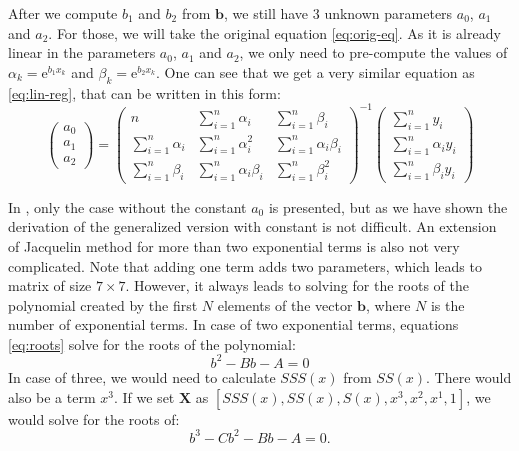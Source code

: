 After we compute $b_1$ and $b_2$ from $\boldsymbol{b}$, we still have 3 unknown parameters $a_0$, $a_1$ and $a_2$. For those, we will take the original equation \ref{eq:orig-eq}. As it is already linear in the parameters $a_0$, $a_1$ and $a_2$, we only need to pre-compute the values of $\alpha_k=\mathrm{e}^{b_1x_k}$ and $\beta_k =\mathrm{e}^{b_2x_k}$.
One can see that we get a very similar equation as \ref{eq:lin-reg}, that can be written in this form:
\begin{equation}
	\begin{pmatrix}
		a_0 \\
		a_1 \\
		a_2
	\end{pmatrix} 
	=
	\begin{pmatrix}
		n & \sum\limits_{i=1}^n\alpha_i & \sum\limits_{i=1}^n\beta_i  \\
		\sum\limits_{i=1}^n\alpha_i & \sum\limits_{i=1}^n\alpha_i^2 & \sum\limits_{i=1}^n\alpha_i\beta_i  \\
		\sum\limits_{i=1}^n\beta_i & \sum\limits_{i=1}^n\alpha_i\beta_i & \sum\limits_{i=1}^n\beta_i^2
	\end{pmatrix}^{-1}
	\begin{pmatrix}
		\sum\limits_{i=1}^ny_i \\
		\sum\limits_{i=1}^n\alpha_iy_i \\
		\sum\limits_{i=1}^n\beta_iy_i
	\end{pmatrix}
\end{equation}

In \cite{jacquelin2014}, only the case without the constant $a_0$ is presented, but as we have shown the derivation of the generalized version with constant is not difficult. An extension of Jacquelin method for more than two exponential terms is also not very complicated. Note that adding one term adds two parameters, which leads to matrix of size $7\times7$. However, it always leads to solving for the roots of the polynomial created by the first $N$ elements of the vector $\boldsymbol{b}$, where $N$ is the number of exponential terms. In case of two exponential terms, equations \ref{eq:roots} solve for the roots of the polynomial:
\begin{equation}
	b^2-Bb-A=0
\end{equation}
In case of three, we would need to calculate $SSS(x)$ from $SS(x)$. There would also be a term $x^3$. If we set $\boldsymbol{X}$ as $\left[SSS(x),SS(x),S(x),x^3,x^2,x^1,1\right]$, we would solve for the roots of:
\begin{equation}
	b^3-Cb^2-Bb-A=0.
\end{equation}

